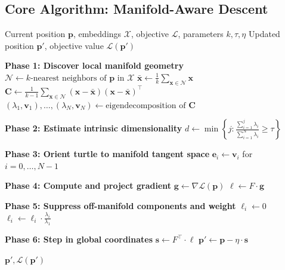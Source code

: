 \documentclass[11pt,letterpaper]{article}
\newcommand{\pos}{\mathbf{p}}
\newcommand{\basis}{\mathbf{e}}
\newcommand{\grad}{\nabla}
\newcommand{\obj}{\mathcal{L}}
\newcommand{\cov}{\mathbf{C}}
\begin{document}
\subsection{Core Algorithm: Manifold-Aware Descent}

\begin{algorithm}[H]
\caption{ManifoldWalker.Step}
\label{alg:step}
\begin{algorithmic}[1]
\Require Current position $\pos$, embeddings $\mathcal{X}$, objective $\obj$, parameters $k, \tau, \eta$
\Ensure Updated position $\pos'$, objective value $\obj(\pos')$
\Statex

\State \textbf{Phase 1: Discover local manifold geometry}
\State $\mathcal{N} \leftarrow k\text{-nearest neighbors of } \pos \text{ in } \mathcal{X}$
\State $\bar{\mathbf{x}} \leftarrow \frac{1}{k}\sum_{\mathbf{x} \in \mathcal{N}} \mathbf{x}$
\State $\cov \leftarrow \frac{1}{k-1}\sum_{\mathbf{x} \in \mathcal{N}} (\mathbf{x} - \bar{\mathbf{x}})(\mathbf{x} - \bar{\mathbf{x}})^\top$
\State $(\lambda_1, \mathbf{v}_1), \ldots, (\lambda_N, \mathbf{v}_N) \leftarrow \text{eigendecomposition of } \cov$ 

\Statex
\State \textbf{Phase 2: Estimate intrinsic dimensionality}
\State $d \leftarrow \min\left\{j : \frac{\sum_{i=1}^{j} \lambda_i}{\sum_{i=1}^{N} \lambda_i} \geq \tau\right\}$

\Statex
\State \textbf{Phase 3: Orient turtle to manifold tangent space}
\State $\basis_i \leftarrow \mathbf{v}_i$ for $i = 0, \ldots, N-1$ 

\Statex
\State \textbf{Phase 4: Compute and project gradient}
\State $\mathbf{g} \leftarrow \grad\obj(\pos)$ 
\State $\bm{\ell} \leftarrow F \cdot \mathbf{g}$ 

\Statex
\State \textbf{Phase 5: Suppress off-manifold components and weight}
    \State $\ell_i \leftarrow 0$ 
  \Else
    \State $\ell_i \leftarrow \ell_i \cdot \frac{\lambda_i}{\lambda_1}$ 
  \EndIf
\EndFor

\Statex
\State \textbf{Phase 6: Step in global coordinates}
\State $\mathbf{s} \leftarrow F^\top \cdot \bm{\ell}$ 
\State $\pos' \leftarrow \pos - \eta \cdot \mathbf{s}$ 

\Statex
\State \Return $\pos', \obj(\pos')$
\end{algorithmic}
\end{algorithm}
\end{document}
